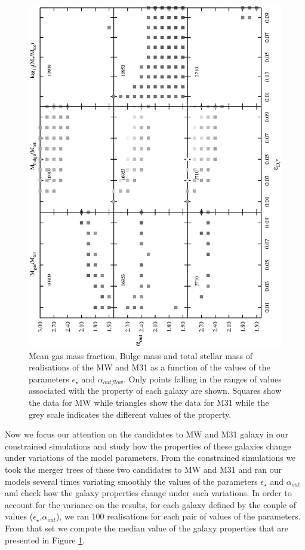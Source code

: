 \documentclass[useAMS,usenatbib]{mn2e}
\begin{document}
\begin{figure}
  \includegraphics[scale=0.55,angle=270]{figures/hist_GasFrac_M31.ps}
\caption{Mean gas mass fraction, Bulge mass and total stellar mass of
  realisations of the MW and M31 as a function of the values of the
  parameters $\epsilon_{\star}$ and $\alpha_{outflow}$. Only points
  falling in the ranges of values associated with the property of each
  galaxy are shown. Squares show the data for MW while triangles show
  the data for M31 while the grey scale indicates the different values
  of the property.}
\label{fig:runCands}
\end{figure}

Now we focus our attention on the candidates to MW and M31 galaxy in
our constrained simulations and study how the properties of these
galaxies change under variations of the model parameters. From the
constrained simulations we took the merger trees of these two
candidates to MW and M31 and ran our models several times variating
smoothly the values of the parameters $\epsilon_{\star}$ and
$\alpha_{out}$ and check how the galaxy properties change under such
variations. In order to account for the variance on the results, for
each galaxy defined by the couple of values
($\epsilon_{\star}$,$\alpha_{out}$), we ran 100 realisations for each
pair of values of the parameters. From that set we compute the median
value of the galaxy properties that are presented in Figure
\ref{fig:runCands}.
\end{document}
